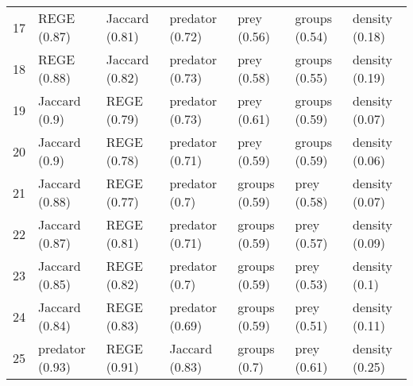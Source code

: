 \begin{table}[ht]
\begin{tabular}{rllllll}
  17 & REGE (0.87) & Jaccard (0.81) & predator (0.72) & prey (0.56) & groups (0.54) & density (0.18) \\ 
  18 & REGE (0.88) & Jaccard (0.82) & predator (0.73) & prey (0.58) & groups (0.55) & density (0.19) \\ 
  19 & Jaccard (0.9) & REGE (0.79) & predator (0.73) & prey (0.61) & groups (0.59) & density (0.07) \\ 
  20 & Jaccard (0.9) & REGE (0.78) & predator (0.71) & prey (0.59) & groups (0.59) & density (0.06) \\ 
  21 & Jaccard (0.88) & REGE (0.77) & predator (0.7) & groups (0.59) & prey (0.58) & density (0.07) \\ 
  22 & Jaccard (0.87) & REGE (0.81) & predator (0.71) & groups (0.59) & prey (0.57) & density (0.09) \\ 
  23 & Jaccard (0.85) & REGE (0.82) & predator (0.7) & groups (0.59) & prey (0.53) & density (0.1) \\ 
  24 & Jaccard (0.84) & REGE (0.83) & predator (0.69) & groups (0.59) & prey (0.51) & density (0.11) \\ 
  25 & predator (0.93) & REGE (0.91) & Jaccard (0.83) & groups (0.7) & prey (0.61) & density (0.25) \\ 
   \hline
\end{tabular}
\end{table}
